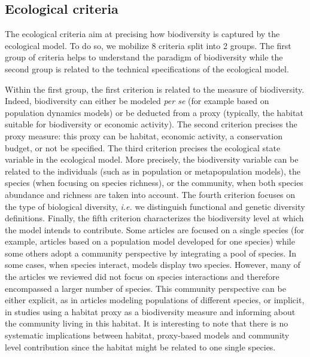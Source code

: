 \subsection{Ecological criteria}

The ecological criteria aim at precising how biodiversity is captured by the ecological model. To do so, we mobilize 8 criteria split into 2 groups. The first group of criteria helps to understand the paradigm of biodiversity while the second group is  related to the technical specifications  of the ecological model.

Within the first group, the first criterion is related to the  measure of biodiversity. Indeed, biodiversity can either be modeled \textit{per se} (for example based on population dynamics models) or be deducted from a proxy (typically, the habitat suitable for biodiversity or economic activity). The second criterion precises the proxy measure: this proxy can be habitat, economic activity, a conservation budget, or not be specified. 
The third criterion precises the ecological state variable in the ecological model. More precisely, the biodiversity variable can be related to the individuals (such as in population or metapopulation models), the species (when focusing on species richness), or the community, when both species abundance and richness are taken into account. 
The fourth criterion focuses on the type of biological diversity, \textit{i.e.} we distinguish functional and genetic diversity definitions. 
Finally, the fifth criterion characterizes the biodiversity level at which the model intends to contribute. Some articles are focused on a single species (for example, articles based on a population model developed for one species) while some others adopt a community perspective by integrating a pool of species. In some cases, when species interact, models display two species. However, many of the articles we reviewed did not focus on species interactions and therefore encompassed a larger number of species. This community perspective can be either explicit, as in articles modeling populations of different species, or implicit, in studies using a habitat proxy as a biodiversity measure and informing about the community living in this habitat. It is interesting to note that there is no systematic implications between habitat, proxy-based models and community level contribution since the habitat might be related to one single species. 

